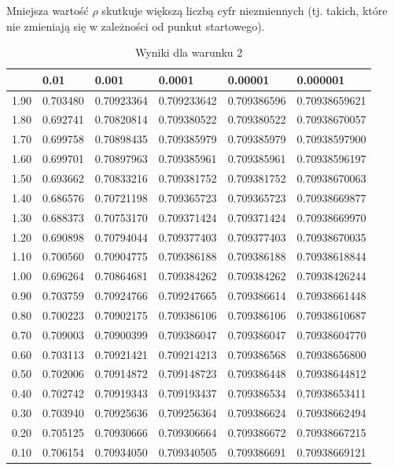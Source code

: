 \documentclass{article}
\begin{document}
Mniejsza wartość $\rho$ skutkuje większą liczbą cyfr niezmiennych (tj. takich, które nie zmieniają się w zależności od punkut startowego).

\begin{table}[H]
\centering
\begin{tabular}{|l|l|l|l|l|l|}
\hline
& 0.01 & 0.001 & 0.0001 & 0.00001 & 0.000001 \\ \hline
1.90 & 0.703480 & 0.70923364 & 0.709233642 & 0.709386596 & 0.70938659621 \\ \hline
1.80 & 0.692741 & 0.70820814 & 0.709380522 & 0.709380522 & 0.70938670057 \\ \hline
1.70 & 0.699758 & 0.70898435 & 0.709385979 & 0.709385979 & 0.70938597900 \\ \hline
1.60 & 0.699701 & 0.70897963 & 0.709385961 & 0.709385961 & 0.70938596197 \\ \hline
1.50 & 0.693662 & 0.70833216 & 0.709381752 & 0.709381752 & 0.70938670063 \\ \hline
1.40 & 0.686576 & 0.70721198 & 0.709365723 & 0.709365723 & 0.70938669877 \\ \hline
1.30 & 0.688373 & 0.70753170 & 0.709371424 & 0.709371424 & 0.70938669970 \\ \hline
1.20 & 0.690898 & 0.70794044 & 0.709377403 & 0.709377403 & 0.70938670035 \\ \hline
1.10 & 0.700560 & 0.70904775 & 0.709386188 & 0.709386188 & 0.70938618844 \\ \hline
1.00 & 0.696264 & 0.70864681 & 0.709384262 & 0.709384262 & 0.70938426244 \\ \hline
0.90 & 0.703759 & 0.70924766 & 0.709247665 & 0.709386614 & 0.70938661448 \\ \hline
0.80 & 0.700223 & 0.70902175 & 0.709386106 & 0.709386106 & 0.70938610687 \\ \hline
0.70 & 0.709003 & 0.70900399 & 0.709386047 & 0.709386047 & 0.70938604770 \\ \hline
0.60 & 0.703113 & 0.70921421 & 0.709214213 & 0.709386568 & 0.70938656800 \\ \hline
0.50 & 0.702006 & 0.70914872 & 0.709148723 & 0.709386448 & 0.70938644812 \\ \hline
0.40 & 0.702742 & 0.70919343 & 0.709193437 & 0.709386534 & 0.70938653411 \\ \hline
0.30 & 0.703940 & 0.70925636 & 0.709256364 & 0.709386624 & 0.70938662494 \\ \hline
0.20 & 0.705125 & 0.70930666 & 0.709306664 & 0.709386672 & 0.70938667215 \\ \hline
0.10 & 0.706154 & 0.70934050 & 0.709340505 & 0.709386691 & 0.70938669121 \\ \hline
\end{tabular}
\caption{Wyniki dla warunku 2}
\end{table}
\end{document}
